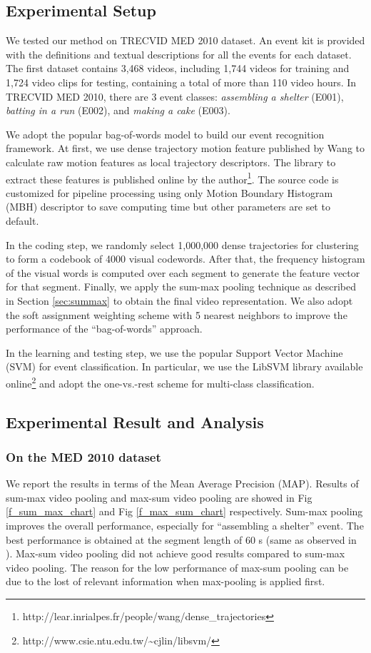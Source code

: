 \subsection{Experimental Setup}
We tested our method on TRECVID MED 2010 dataset. An event kit is provided with the definitions and textual descriptions for all the events for each dataset. The first dataset contains 3,468 videos, including 1,744 videos for training and 1,724 video clips for testing, containing a total of more than 110 video hours. In TRECVID MED 2010, there are 3 event classes: \textit{assembling a shelter} (E001), \textit{batting in a run} (E002), and \textit{making a cake} (E003).

We adopt the popular bag-of-words model to build our event recognition framework. At first, we use dense trajectory motion feature published by Wang \cite{wang:2011:inria-00583818:1} to calculate raw motion features as local trajectory descriptors. The library to extract these features is published online by the author\footnote{http://lear.inrialpes.fr/people/wang/dense\_trajectories}. The source code is customized for pipeline processing using only Motion Boundary Histogram (MBH) descriptor to save computing time but other parameters are set to default. 

In the coding step, we randomly select 1,000,000 dense trajectories for clustering to form a codebook of 4000 visual codewords. After that, the frequency histogram of the visual words is computed over each segment to generate the feature vector for that segment. Finally, we apply the sum-max pooling technique as described in Section \ref{sec:summax} to obtain the final video representation. We also adopt the soft assignment weighting scheme \cite{Jiang:2007:TOB} with 5 nearest neighbors to improve the performance of the ``bag-of-words'' approach.

In the learning and testing step, we use the popular Support Vector Machine (SVM) for event classification. In particular, we use the LibSVM library available online\footnote{http://www.csie.ntu.edu.tw/{\textasciitilde}cjlin/libsvm/} and adopt the one-vs.-rest scheme for multi-class classification. 

\subsection{Experimental Result and Analysis}

\subsubsection{On the MED 2010 dataset}
We report the results in terms of the Mean Average Precision (MAP). Results of sum-max video pooling and max-sum video pooling are showed in Fig \ref{f_sum_max_chart} and Fig \ref{f_max_sum_chart} respectively. Sum-max pooling improves the overall performance, especially for ``assembling a shelter'' event. The best performance is obtained at the segment length of 60 s (same as observed in \cite{DBLP:journals/vlsisp/PhanNLTLDS14}). Max-sum video pooling did not achieve good results compared to sum-max video pooling. The reason for the low performance of max-sum pooling can be due to the lost of relevant information when max-pooling is applied first. 

